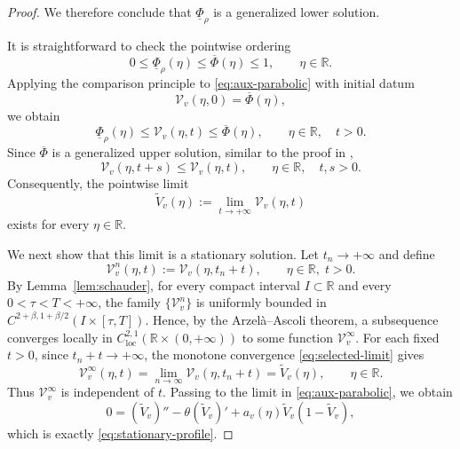 \documentclass[preprint,sort&compress,final,12pt]{elsarticle}
\numberwithin{equation}{section}
\begin{document}
\begin{proof}
We therefore conclude that $\underline\Phi_\rho$ is a generalized lower solution.

It is straightforward to check the pointwise ordering
\begin{equation*}
0\le \underline\Phi_\rho(\eta)\le\overline\Phi(\eta)\le1,
\qquad \eta\in\mathbb R.
\end{equation*}
Applying the comparison principle to \eqref{eq:aux-parabolic} with initial datum
\begin{equation*}
\mathcal V_v(\eta,0)=\overline\Phi(\eta),
\end{equation*}
we obtain
\begin{equation}\label{eq:aux-flow-order}
\underline\Phi_\rho(\eta) \le \mathcal V_v(\eta,t)
\le \overline\Phi(\eta), \qquad
\eta\in\mathbb R,\quad t>0.
\end{equation}
Since $\overline\Phi$ is a generalized upper solution, similar to the proof in \cite[Proposition 4.2]{2021 Lijing wangzhian},
\begin{equation*}
\mathcal V_v(\eta,t+s)\le \mathcal V_v(\eta,t),
\qquad
\eta\in\mathbb R,\quad t,s>0.
\end{equation*}
Consequently, the pointwise limit
\begin{equation}\label{eq:selected-limit}
\widetilde V_v(\eta):=\lim_{t\to+\infty}\mathcal V_v(\eta,t)
\end{equation}
exists for every $\eta\in\mathbb R$.

We next show that this limit is a stationary solution. Let $t_n\to+\infty$ and define
\begin{equation*}
\mathcal V_v^n(\eta,t):=\mathcal V_v(\eta,t_n+t),
\qquad \eta\in\mathbb R,\; t>0.
\end{equation*}
By Lemma~\ref{lem:schauder}, for every compact interval $I\subset\mathbb R$ and every $0<\tau<T<+\infty$, the family $\{\mathcal V_v^n\}$ is uniformly bounded in $C^{2+\beta,1+\beta/2}(I\times[\tau,T])$. Hence, by the Arzel\`a--Ascoli theorem, a subsequence converges locally in $C^{2,1}_{\mathrm{loc}}(\mathbb R\times(0,+\infty))$ to some function $\mathcal V_v^\infty$. For each fixed $t>0$, since $t_n+t\to+\infty$, the monotone convergence \eqref{eq:selected-limit} gives
\begin{equation*}
\mathcal V_v^\infty(\eta,t)=\lim_{n\to\infty}\mathcal V_v(\eta,t_n+t)=\widetilde V_v(\eta),
\qquad \eta\in\mathbb R.
\end{equation*}
Thus $\mathcal V_v^\infty$ is independent of $t$. Passing to the limit in \eqref{eq:aux-parabolic}, we obtain
\begin{equation*}
0=(\widetilde V_v)''-\theta(\widetilde V_v)'+a_v(\eta)\widetilde V_v(1-\widetilde V_v),
\end{equation*}
which is exactly \eqref{eq:stationary-profile}.


\end{proof}
\end{document}
